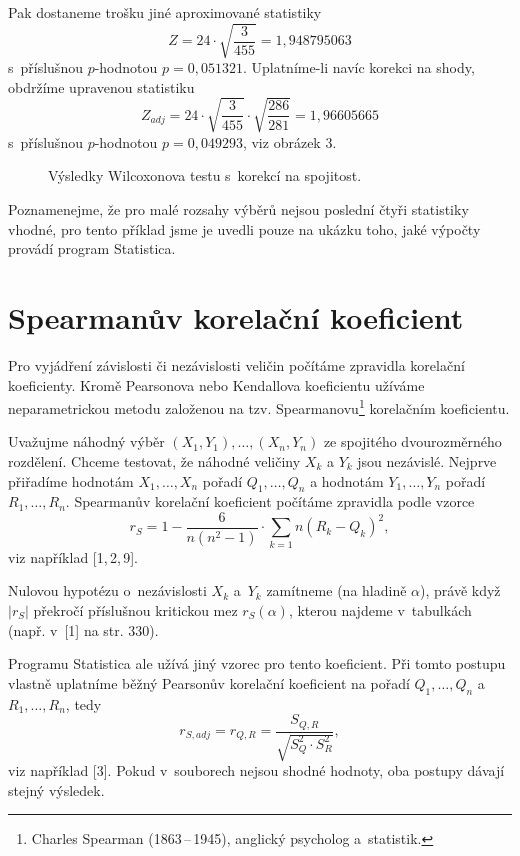 Pak dostaneme trošku jiné aproximované statistiky
  $$Z=24\cdot \sqrt{ \frac{3}{455}} =1{,}948795063 $$
  s~příslušnou $p$-hodnotou $p=0{,}051321$. Uplatníme-li navíc korekci na shody, obdržíme upravenou statistiku
  $$Z_{adj}=24\cdot \sqrt{ \frac{3}{455}}\cdot \sqrt{\frac{286}{281}} =1{,}96605665 $$
  s~příslušnou $p$-hodnotou $p=0{,}049293$, viz obrázek 3.

\begin{figure}[!bht]
\caption{Výsledky Wilcoxonova testu s~korekcí na spojitost.}
\end{figure}

 Poznamenejme, že pro malé rozsahy výběrů nejsou poslední čtyři statistiky vhodné, pro tento příklad jsme je uvedli pouze na ukázku toho, jaké výpočty provádí program Statistica.


\section{Spearmanův korelační koeficient}

Pro vyjádření závislosti či nezávislosti veličin počítáme zpravidla korelační koeficienty. Kromě Pearsonova nebo Kendallova koeficientu užíváme neparametrickou metodu založenou
na tzv. Spearmanovu\footnote{Charles Spearman (1863\,--\,1945), anglický psycholog a~statistik.}
 korelačním koeficientu.

Uvažujme náhodný výběr $(X_{1},Y_{1}),\dots,(X_{n},Y_{n})$ ze spojitého dvourozměrného rozdělení. Chceme testovat, že náhodné veličiny $X_k$ a $Y_k$ jsou nezávislé.
Nejprve přiřadíme  hodnotám $X_1,\dots, X_n$ pořadí $Q_1,\dots, Q_n$ a
 hodnotám $Y_1,\dots, Y_n$  pořadí $R_1,\dots, R_n$. Spearmanův korelační koeficient počítáme zpravidla podle vzorce
$$ r_S=1-\frac6{n(n^2-1)}\cdot \sum_{k=1}n (R_k-Q_k)^2 ,$$
viz například [1,\,2,\,9].

 Nulovou hypotézu o~nezávislosti $X_k$ a~$Y_k$  zamítneme (na hladině $\alpha$), právě když
$ |r_S| $ překročí příslušnou kritickou mez $r_S(\alpha)$, kterou najdeme v~tabulkách (např. v~[1] na str. 330).

Programu Statistica ale užívá jiný vzorec pro tento koeficient. Při tomto postupu vlastně uplatníme běžný Pearsonův korelační koeficient na pořadí $Q_1,\dots, Q_n$ a~$R_1,\dots, R_n$, tedy
$$r_{S, adj}= r_{Q,R}=\frac{S_{Q,R}}{\sqrt{ S_Q^2 \cdot S_R^2}} ,$$
viz například [3].
Pokud v~souborech nejsou shodné hodnoty, oba postupy dávají stejný výsledek.

